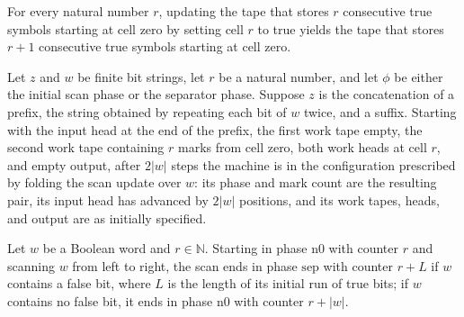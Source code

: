 \begin{theorem}
\label{BoolCircuit.CircuitEval.wr_replicate}
\leanok
{}
For every natural number $r$, updating the tape that stores $r$ consecutive true symbols
starting at cell zero by setting cell $r$ to true yields the tape that stores $r+1$
consecutive true symbols starting at cell zero.
\end{theorem}

\begin{theorem}
\label{BoolCircuit.CircuitEval.setup_scan}
\leanok
{}
Let $z$ and $w$ be finite bit strings, let $r$ be a natural number, and let $\phi$ be
either the initial scan phase or the separator phase. Suppose $z$ is the concatenation
of a prefix, the string obtained by repeating each bit of $w$ twice, and a suffix.
Starting with the input head at the end of the prefix, the first work tape empty, the
second work tape containing $r$ marks from cell zero, both work heads at cell $r$, and
empty output, after $2|w|$ steps the machine is in the configuration prescribed by
folding the scan update over $w$: its phase and mark count are the resulting pair, its
input head has advanced by $2|w|$ positions, and its work tapes, heads, and output are
as initially specified.
\end{theorem}

\begin{theorem}
\label{BoolCircuit.CircuitEval.scanF_n0}
\leanok
{}
Let $w$ be a Boolean word and $r\in\mathbb N$. Starting in phase $\mathrm{n0}$ with
counter $r$ and scanning $w$ from left to right, the scan ends in phase $\mathrm{sep}$
with counter $r+L$ if $w$ contains a false bit, where $L$ is the length of its initial
run of true bits; if $w$ contains no false bit, it ends in phase $\mathrm{n0}$ with
counter $r+|w|$.
\end{theorem}


